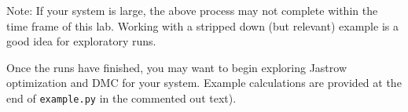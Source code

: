 Note: If your system is large, the above process may not complete within the time frame of this lab.  Working with a stripped down (but relevant) example is a good idea for exploratory runs.

Once the runs have finished, you may want to begin exploring Jastrow optimization and DMC for your system.  Example calculations are provided at the end of \texttt{example.py} in the commented out text).









